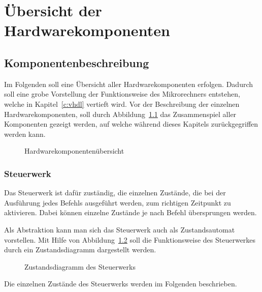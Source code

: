 \chapter{Übersicht der Hardwarekomponenten}
\label{c:hardware}
\section{Komponentenbeschreibung}
Im Folgenden soll eine Übersicht aller Hardwarekomponenten erfolgen. Dadurch
soll eine grobe Vorstellung der Funktionsweise des Mikrorechners entstehen,
welche in Kapitel~\ref{c:vhdl} vertieft wird. Vor der Beschreibung der einzelnen
Hardwarekomponenten, soll durch Abbildung~\ref{pic:hardware_overview} das
Zusammenspiel aller Komponenten gezeigt werden, auf welche während dieses
Kapitels zurückgegriffen werden kann.
\begin{figure}[hb]
\centering
\def\svgwidth{\columnwidth}

\caption{Hardwarekomponentenübersicht}
\label{pic:hardware_overview}
\end{figure}
\pagebreak
\subsection{Steuerwerk}
\label{s:control}
Das Steuerwerk ist dafür zuständig, die einzelnen Zustände, die bei der
Ausführung jedes Befehls ausgeführt werden, zum richtigen Zeitpunkt zu
aktivieren. Dabei können einzelne Zustände je nach Befehl übersprungen werden.

Als Abstraktion kann man sich das Steuerwerk auch als Zustandsautomat
vorstellen. Mit Hilfe von Abbildung~\ref{pic:zustandsdiagramm} soll die
Funktionsweise des Steuerwerkes durch ein Zustandsdiagramm dargestellt werden.

\begin{figure}[htb]
\centering
{}
\caption{Zustandsdiagramm des Steuerwerks}
\label{pic:zustandsdiagramm}
\end{figure}
\pagebreak
Die einzelnen Zustände des Steuerwerks werden im Folgenden beschrieben.

